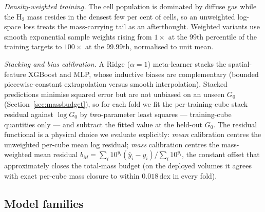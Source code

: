 \documentclass[fleqn,usenatbib]{rasti}
\newcommand{\Gzero}{G_0}
\newcommand{\dex}{\,\text{dex}}
\begin{document}
\emph{Density-weighted training.} The cell population is dominated by
diffuse gas while the H\(_2\) mass resides in the densest few per cent of
cells, so an unweighted log-space loss treats the mass-carrying tail as
an afterthought. Weighted variants use smooth exponential sample weights
rising from \(1\times\) at the 99th percentile of the training targets to
\(100\times\) at the 99.99th, normalised to unit mean.

\emph{Stacking and bias calibration.} A Ridge (\(\alpha = 1\))
meta-learner stacks the spatial-feature XGBoost and MLP, whose inductive
biases are complementary (bounded piecewise-constant extrapolation
versus smooth interpolation). Stacked predictions minimise squared error
but are not unbiased on an unseen \(\Gzero\)
(Section~\ref{sec:massbudget}), so for each fold we fit the
per-training-cube stack residual against \(\log\Gzero\) by two-parameter
least squares --- training-cube quantities only --- and subtract the
fitted value at the held-out \(\Gzero\). The residual functional is a
physical choice we evaluate explicitly: \emph{mean} calibration centres
the unweighted per-cube mean log residual; \emph{mass} calibration
centres the mass-weighted mean residual
\(b_M = \sum_i 10^{y_i}(\hat y_i - y_i)/\sum_i 10^{y_i}\), the constant
offset that approximately closes the total-mass budget (on the deployed
volumes it agrees with exact per-cube mass closure to within
\(0.018\dex\) in every fold).

\subsection{Model families}
\label{sec:models}
\end{document}
